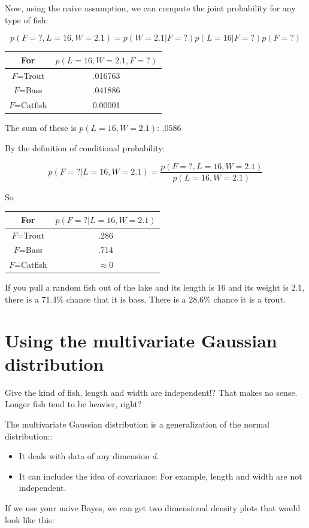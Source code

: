 Now, using the naive assumption, we can compute the joint probability for any type of fish: 

$$p(F=?, L=16 , W=2.1) = p(W=2.1 | F=?) p(L=16 | F=?)p(F=?)$$

\begin{tabular}{c | c }
For & $p(L=16, W=2.1, F=?)$ \\
\hline
$F$=Trout & .016763\\
$F$=Bass &  .041886  \\
$F$=Catfish  &  0.00001\\
\end{tabular}

The sum of these is $p(L=16, W=2.1)$: $.0586$

By the definition of conditional probability:

$$p(F=? | L=16, W=2.1) = \frac{p(F=?, L=16, W=2.1) }{p(L=16, W=2.1)}$$

So

\begin{tabular}{c | c }
For & $p(F=? | L=16, W=2.1)$ \\
\hline
$F$=Trout & .286\\
$F$=Bass &  .714  \\
$F$=Catfish  &  $\approx 0$\\
\end{tabular}

If you pull a random fish out of the lake and its length is 16 and its weight is 2.1, there is a 71.4\% chance that it is bass.  There is a 28.6\% chance it is a trout.

\section{Using the multivariate Gaussian distribution}

Give the kind of fish, length and width are independent!?  That makes no sense.  Longer fish tend to be heavier, right?

The multivariate Gaussian distribution is a generalization of the normal distribution::
\begin{itemize}
\item It deals with data of any dimension $d$.
\item It can includes the idea of covariance: For example, length and width are not independent.
\end{itemize}

If we use your naive Bayes,  we can get two dimensional density plots that would look like this:

